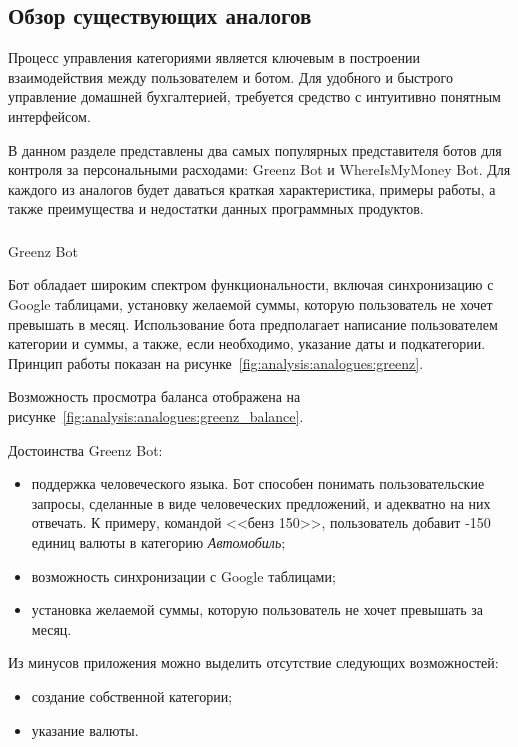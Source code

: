 \subsection{Обзор существующих аналогов}
\label{sec:analysis:analogues}

Процесс управления категориями является ключевым в построении взаимодействия между пользователем и ботом. Для удобного и быстрого управление домашней бухгалтерией, требуется средство с интуитивно понятным интерфейсом.

В данном разделе представлены два самых популярных представителя ботов для контроля за персональными расходами: Greenz Bot и \linebreak WhereIsMyMoney Bot. Для каждого из аналогов будет даваться краткая характеристика, примеры работы, а также преимущества и недостатки данных программных продуктов.

\subsubsection{} Greenz Bot
\label{sec:analysis:analogues:greenz}

Бот обладает широким спектром функциональности, включая синхронизацию с Google таблицами, установку желаемой суммы, которую пользователь не хочет превышать в месяц. Использование бота предполагает написание пользователем категории и суммы, а также, если необходимо, указание даты и подкатегории. Принцип работы показан на рисунке~\ref{fig:analysis:analogues:greenz}.

Возможность просмотра баланса отображена на рисунке~\ref{fig:analysis:analogues:greenz_balance}.

Достоинства Greenz Bot:

\begin{itemize}
	\item поддержка человеческого языка. Бот способен понимать пользовательские запросы, сделанные в виде человеческих предложений, и адекватно на них отвечать. К примеру, командой <<бенз 150>>, пользователь добавит -150 единиц валюты в категорию \emph{Автомобиль};
	\item возможность синхронизации с Google таблицами;
	\item установка желаемой суммы, которую пользователь не хочет превышать за месяц.
\end{itemize}

Из минусов приложения можно выделить отсутствие следующих возможностей:

\begin{itemize}
	\item создание собственной категории;
	\item указание валюты.
\end{itemize}

